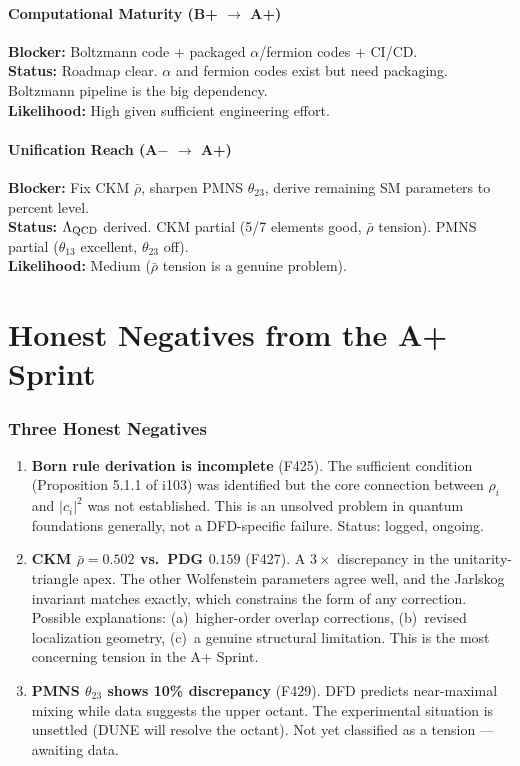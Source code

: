 \documentclass[11pt,a4paper]{article}
\begin{document}
\subsection{Computational Maturity (B+ $\to$ A+)}
\textbf{Blocker:} Boltzmann code + packaged $\alpha$/fermion codes + CI/CD.\\
\textbf{Status:} Roadmap clear. $\alpha$ and fermion codes exist but need
packaging. Boltzmann pipeline is the big dependency.\\
\textbf{Likelihood:} \textcolor{gradeA}{High given sufficient engineering effort}.

\subsection{Unification Reach (A$-$ $\to$ A+)}
\textbf{Blocker:} Fix CKM $\bar\rho$, sharpen PMNS $\theta_{23}$, derive
remaining SM parameters to percent level.\\
\textbf{Status:} $\Lambda_{\rm QCD}$ derived. CKM partial (5/7 elements good,
$\bar\rho$ tension). PMNS partial ($\theta_{13}$ excellent, $\theta_{23}$ off).\\
\textbf{Likelihood:} \textcolor{gradeBplus}{Medium} ($\bar\rho$ tension is a genuine problem).


\newpage
\part{Honest Negatives from the A+ Sprint}
\label{part:negatives}

\section{Three Honest Negatives}

\begin{enumerate}
\item \textbf{Born rule derivation is incomplete} (F425).
  The sufficient condition (Proposition 5.1.1 of i103) was identified but
  the core connection between $\rho_i$ and $|c_i|^2$ was not established.
  This is an unsolved problem in quantum foundations generally, not a
  DFD-specific failure. Status: logged, ongoing.

\item \textbf{CKM $\bar\rho = 0.502$ vs.\ PDG $0.159$} (F427).
  A $3\times$ discrepancy in the unitarity-triangle apex. The other
  Wolfenstein parameters agree well, and the Jarlskog invariant matches
  exactly, which constrains the form of any correction. Possible explanations:
  (a)~higher-order overlap corrections, (b)~revised localization geometry,
  (c)~a genuine structural limitation. This is the most concerning tension
  in the A+ Sprint.

\item \textbf{PMNS $\theta_{23}$ shows 10\% discrepancy} (F429).
  DFD predicts near-maximal mixing while data suggests the upper octant.
  The experimental situation is unsettled (DUNE will resolve the octant).
  Not yet classified as a tension --- awaiting data.
\end{enumerate}
\end{document}
